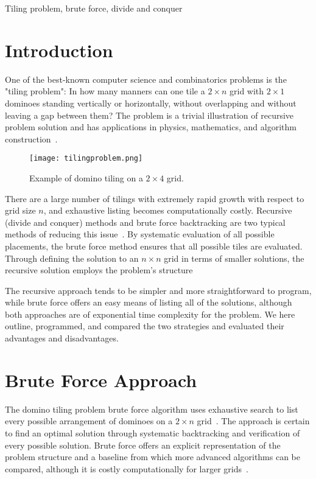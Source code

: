 \documentclass[conference]{IEEEtran}
\begin{document}
\begin{IEEEkeywords}
Tiling problem, brute force, divide and conquer
\end{IEEEkeywords}

\section{Introduction}
One of the best-known computer science and combinatorics problems is the "tiling problem": In how many manners can one tile a $2 \times n$ grid with $2 \times 1$ dominoes standing vertically or horizontally, without overlapping and without leaving a gap between them? The problem is a trivial illustration of recursive problem solution and has applications in physics, mathematics, and algorithm construction~\cite{b2, b1}.

\begin{figure}[htbp]
\centerline{\texttt{[image: tilingproblem.png]}}
\caption{Example of domino tiling on a $2 \times 4$ grid.}
\label{fig:tiling_example}
\end{figure}

There are a large number of tilings with extremely rapid growth with respect to grid size $n$, and exhaustive listing becomes computationally costly. Recursive (divide and conquer) methods and brute force backtracking are two typical methods of reducing this issue~\cite{b3, b4}. By systematic evaluation of all possible placements, the brute force method ensures that all possible tiles are evaluated. Through defining the solution to an $n \times n$ grid in terms of smaller solutions, the recursive solution employs the problem's structure~\cite{b1, b2}

The recursive approach tends to be simpler and more straightforward to program, while brute force offers an easy means of listing all of the solutions, although both approaches are of exponential time complexity for the problem. We here outline, programmed, and compared the two strategies and evaluated their advantages and disadvantages.

\section{Brute Force Approach}

The domino tiling problem brute force algorithm uses exhaustive search to list every possible arrangement of dominoes on a $2 \times n$ grid~\cite{b3}. The approach is certain to find an optimal solution through systematic backtracking and verification of every possible solution. Brute force offers an explicit representation of the problem structure and a baseline from which more advanced algorithms can be compared, although it is costly computationally for larger grids~\cite{b4}.
\end{document}
